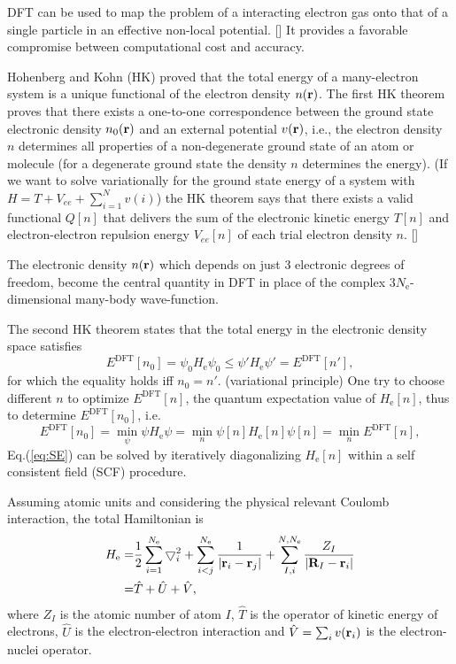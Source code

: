 DFT can be used to map the problem of a interacting electron gas onto that of a single particle in an effective non-local 
potential. [\cite{MCP92}] It provides a favorable compromise between computational cost and accuracy.

Hohenberg and Kohn (HK) proved that the total energy of a many-electron system is a unique functional of the electron density $n(\bf r)$.
The first HK theorem proves that there exists a one-to-one correspondence between the ground state electronic density $n_0(\bf r)$ 
and an external potential $v(\bf r)$, i.e., the electron density  $n$ determines all
properties of a non-degenerate ground state of an atom or molecule (for a degenerate 
ground state the density $n$ determines the energy).
(If we want to solve variationally for the ground state energy of a system with $H=T + V_{ee}+\sum_{i=1}^N v(i)$) the 
HK theorem says that there exists a valid functional $Q[n]$ that delivers the sum of the electronic kinetic energy $T[n]$ 
and electron-electron repulsion energy $V_{ee}[n]$ of each trial electron density $n$. [\cite{Levy1979}]

The electronic density $n(\bf r)$ which depends on just 3 electronic degrees of freedom, become the central quantity in DFT 
in place of the complex $3N_{\text{e}}$-dimensional many-body wave-function.

The second HK theorem states that the total energy in the electronic density space satisfies
\begin{equation}
        E^{\text{DFT}}[n_0]= \psi_0  H_{\text{e}} \psi_0 \leq \psi' H_{\text{e}} \psi' =E^{\text{DFT}}[n'],
\label{eq:HK2}
\end{equation}
for which the equality holds iff $n_0=n'$. (variational principle)
One try to choose different $n$ to optimize $E^{\text{DFT}}[n]$, the quantum expectation value of $H_{\text{e}}[n]$, thus to determine $E^{\text{DFT}}[n_0]$, i.e.
\begin{equation}
E^{\text{DFT}}[n_0]= \min\limits_{\psi} \psi  H_{\text{e}} \psi  = \min\limits_{n}\psi[n]H_{\text{e}}[n]\psi[n] =\min\limits_{n}E^{\text{DFT}}[n],
\label{eq:var}
\end{equation}
Eq.\thinspace(\ref{eq:SE}) can be solved by iteratively diagonalizing $H_{\text{e}}[n]$ within a self consistent field (SCF) procedure.

Assuming atomic units and considering the physical relevant Coulomb interaction, the total Hamiltonian is 
\begin{align}        
        H_{\text{e}} =& \frac{1}{2}\sum_{i=1}^{N_{\text{e}}}\bigtriangledown_i^2 +\sum_{i<j}^{N_{\text{e}}}\frac{1}{|{\bf r}_i -{\bf r}_j|} +\sum_{I,i}^{N,N_{\text{e}}}\frac{Z_I}{|{\bf R}_I - {\bf r}_i|}   \nonumber \\
        =& {\hat{T}}+{\hat{U}}+{\hat{V}},
\label{eq:H}
\end{align}
where $Z_I$ is the atomic number of atom $I$, ${\hat{T}}$ is the operator of kinetic energy of electrons, ${\hat{U}}$ is the 
electron-electron interaction and  ${\hat{V}}=\sum_i v({\bf r}_i)$ is the electron-nuclei operator.

